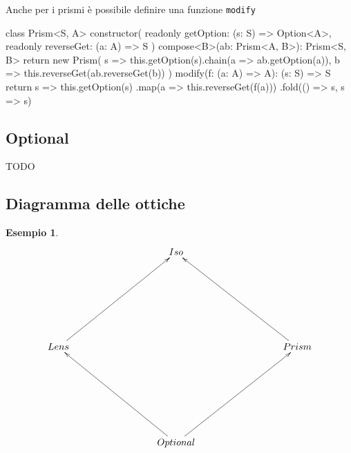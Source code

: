 \documentclass[12pt]{article}
\theoremstyle{definition}
\newtheorem{example}{Esempio}[section]
\newenvironment{code}
  {\vspace{0.5cm} \VerbatimEnvironment\begin{typescriptcode}}
  {\end{typescriptcode} \vspace{0.2cm}}
\begin{document}
Anche per i prismi è possibile definire una funzione \texttt{modify}

\begin{code}
class Prism<S, A> {
  constructor(
    readonly getOption: (s: S) => Option<A>,
    readonly reverseGet: (a: A) => S
  ) {}
  compose<B>(ab: Prism<A, B>): Prism<S, B> {
    return new Prism(
      s => this.getOption(s).chain(a => ab.getOption(a)),
      b => this.reverseGet(ab.reverseGet(b))
    )
  }
  modify(f: (a: A) => A): (s: S) => S {
    return s =>
      this.getOption(s)
        .map(a => this.reverseGet(f(a)))
        .fold(() => s, s => s)
  }
}
\end{code}

\subsection{Optional}

TODO

\subsection{Diagramma delle ottiche}

\begin{example}
\[
\xymatrixrowsep{3cm}
\xymatrixcolsep{3cm}
\xymatrix{
  & Iso \\
  Lens \ar[ur] & & Prism \ar[ul] \\
  & Optional \ar[ul] \ar[ur] \\
}
\]
\end{example}
\end{document}
